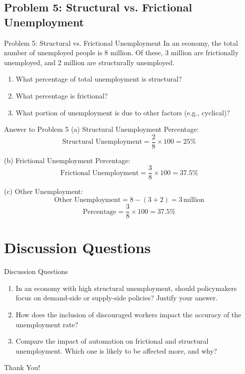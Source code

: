 \documentclass{beamer}
\begin{document}
\subsection{Problem 5: Structural vs. Frictional Unemployment}
\begin{frame}{Problem 5: Structural vs. Frictional Unemployment}
In an economy, the total number of unemployed people is 8 million. Of these, 3 million are frictionally unemployed, and 2 million are structurally unemployed.
\begin{enumerate}
    \item What percentage of total unemployment is structural?  
    \item What percentage is frictional?  
    \item What portion of unemployment is due to other factors (e.g., cyclical)?  
\end{enumerate}
\end{frame}

\begin{frame}{Answer to Problem 5}
(a) Structural Unemployment Percentage:
\[
\text{Structural Unemployment} = \frac{2}{8} \times 100 = 25\%
\]

(b) Frictional Unemployment Percentage:
\[
\text{Frictional Unemployment} = \frac{3}{8} \times 100 = 37.5\%
\]

(c) Other Unemployment:
\[
\text{Other Unemployment} = 8 - (3 + 2) = 3 \, \text{million}
\]
\[
\text{Percentage} = \frac{3}{8} \times 100 = 37.5\%
\]
\end{frame}

\section{Discussion Questions}
\begin{frame}{Discussion Questions}
\begin{enumerate}
    \item In an economy with high structural unemployment, should policymakers focus on demand-side or supply-side policies? Justify your answer.
    \item How does the inclusion of discouraged workers impact the accuracy of the unemployment rate?
    \item Compare the impact of automation on frictional and structural unemployment. Which one is likely to be affected more, and why?
\end{enumerate}
\end{frame}

\begin{frame}
    \centering
    \Huge{Thank You!}
\end{frame}
\end{document}

